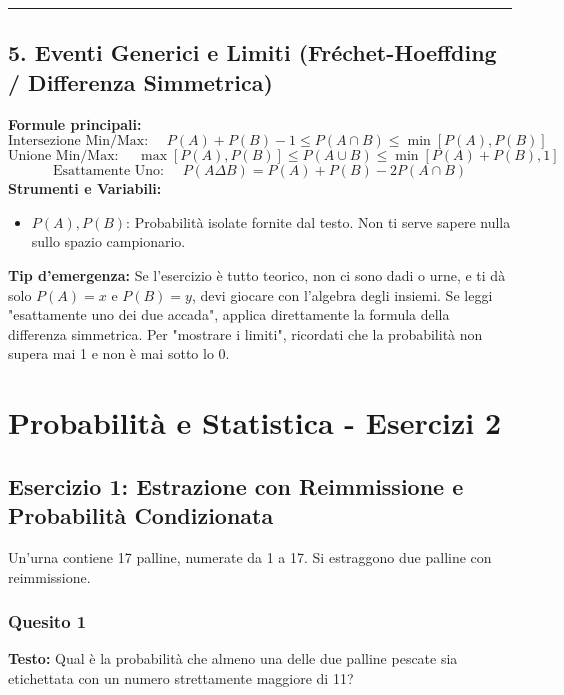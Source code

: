 \documentclass[12pt, a4paper]{article}
\begin{document}
\vspace{0.3cm}\hrule\vspace{0.3cm}

\subsection*{5. Eventi Generici e Limiti (Fréchet-Hoeffding / Differenza Simmetrica)}
\textbf{Formule principali:}
$$ \text{Intersezione Min/Max: } \quad P(A) + P(B) - 1 \le P(A \cap B) \le \min[P(A), P(B)] $$
$$ \text{Unione Min/Max: } \quad \max[P(A), P(B)] \le P(A \cup B) \le \min[P(A) + P(B), 1] $$
$$ \text{Esattamente Uno: } \quad P(A \Delta B) = P(A) + P(B) - 2P(A \cap B) $$
\textbf{Strumenti e Variabili:}
\begin{itemize}
    \item $P(A), P(B)$: Probabilità isolate fornite dal testo. Non ti serve sapere nulla sullo spazio campionario.
\end{itemize}
\textbf{Tip d'emergenza:} Se l'esercizio è tutto teorico, non ci sono dadi o urne, e ti dà solo $P(A) = x$ e $P(B) = y$, devi giocare con l'algebra degli insiemi. Se leggi "esattamente uno dei due accada", applica direttamente la formula della differenza simmetrica. Per "mostrare i limiti", ricordati che la probabilità non supera mai 1 e non è mai sotto lo 0.



\section*{Probabilità e Statistica - Esercizi 2}

\subsection*{Esercizio 1: Estrazione con Reimmissione e Probabilità Condizionata}
Un'urna contiene 17 palline, numerate da 1 a 17. Si estraggono due palline con reimmissione.

\subsubsection*{Quesito 1}
\textbf{Testo:} Qual è la probabilità che almeno una delle due palline pescate sia etichettata con un numero strettamente maggiore di 11?
\end{document}
